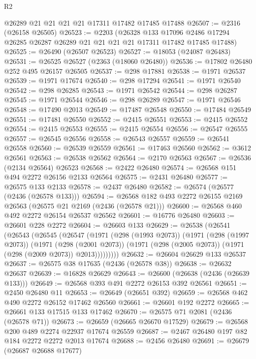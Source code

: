 \begin{lexlean}{R2}
\begin{coremodule}
    @26289
    @21
    @21
    @21
    @21
    @17311
    @17482
    @17485
    @17488
@26507 := @2316 (@26158 @26505)
@26523 := @2203
    (@26328
      @133
      @17096
      @2486
      @17294
      @26285
      @26287
      @26289
      @21
      @21
      @21
      @21
      @17311
      @17482
      @17485
      @17488)
@26525 := @26490 (@26507 @26523)
@26527 := @18053 (@24087 @26483)
@26531 := @26525 @26527 (@2363 (@18060 @26480))
@26536 := @17802 @26480 @252 @495 @26157 @26505
@26537 := @298 @17881
@26538 := @1971 @26537
@26539 := @1971 @17674
@26540 := @298 @17294
@26541 := @1971 @26540
@26542 := @298 @26285
@26543 := @1971 @26542
@26544 := @298 @26287
@26545 := @1971 @26544
@26546 := @298 @26289
@26547 := @1971 @26546
@26548 := @17490 @2013
@26549 := @17487 @26548
@26550 := @17484 @26549
@26551 := @17481 @26550
@26552 := @2415 @26551
@26553 := @2415 @26552
@26554 := @2415 @26553
@26555 := @2415 @26554
@26556 := @26547 @26555
@26557 := @26545 @26556
@26558 := @26543 @26557
@26559 := @26541 @26558
@26560 := @26539 @26559
@26561 := @17463 @26560
@26562 := @3612 @26561
@26563 := @26538 @26562
@26564 := @2170 @26563
@26567 := @26536 (@2134 @26564) @26523
@26568 := @2422 @26480
@26574 := @26568 @151 @494 @2272 @26156 @2133 @26564
@26575 := @2431 @26480
@26577 := @26575 @133 @2133
@26578 := @2437 @26480
@26582 := @26574 (@26577 (@2436 (@26578 @133)))
@26594 := @26568 @182 @493 @2272 @26155 @2169 @26563 (@26575 @21 @2169 (@2436 (@26578 @21)))
@26600 := @26568 @460 @492 @2272 @26154 @26537 @26562
@26601 := @16776 @26480
@26603 := @26601 @228 @2272
@26604 := @26603 @133
@26629 := @26538
    (@26541
      (@26543
        (@26545
          (@26547
            (@1971
              (@298 (@1993 @2073))
              (@1971
                (@298 (@1997 @2073))
                (@1971
                  (@298 (@2001 @2073))
                  (@1971 (@298 (@2005 @2073)) (@1971 (@298 (@2009 @2073)) @2013)))))))))
@26632 := @26604 @26629 @133 @26537
@26637 := @26575 @38 @17635 (@2436 (@26578 @38))
@26638 := @26632 @26637
@26639 := @16828 @26629
@26643 := @26600 (@26638 (@2436 (@26639 @133)))
@26649 := @26568 @393 @491 @2272 @26153 @392 @26561
@26651 := @2450 @26480 @11
@26653 := @26649 (@26651 @392)
@26659 := @26568 @462 @490 @2272 @26152 @17462 @26560
@26661 := @26601 @192 @2272
@26665 := @26661 @133 @17515 @133 @17462
@26670 := @26575 @71 @2081 (@2436 (@26578 @71))
@26673 := @26659 (@26665 @26670 @17529)
@26679 := @26568 @200 @489 @2274 @22937 @17674 @26559
@26687 := @2467 @26480 @197 @82 @184 @2272 @2272 @2013 @17674
@26688 := @2456 @26480
@26691 := @26679 (@26687 @26688 @17677)

\end{coremodule}
\end{lexlean}
